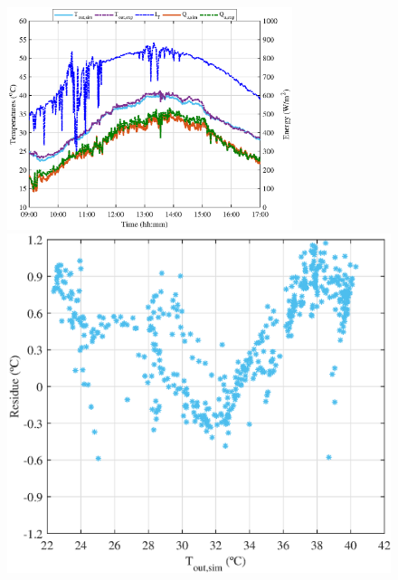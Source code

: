 \begin{figure}[ht!]
\begin{minipage}{0.60\columnwidth}
		\includegraphics[width=0.99\columnwidth,height=65mm]{figs/007-3.eps}
	\end{minipage}
	\begin{minipage}{0.39\columnwidth}
		\includegraphics[scale=0.5,width=1.0\columnwidth]{figs/007-residue-5.eps}

\end{minipage}
\end{figure}
